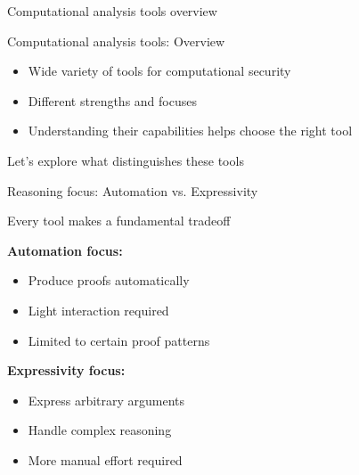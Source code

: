 \documentclass[aspectratio=169, lualatex, handout]{beamer}
\begin{document}
\begin{frame}{Computational analysis tools overview}
\end{frame}

\begin{frame}{Computational analysis tools: Overview}
	\begin{itemize}
		\item Wide variety of tools for computational security
		\item Different strengths and focuses
		\item Understanding their capabilities helps choose the right tool
	\end{itemize}
	\vspace{1em}
	\begin{center}
		\Large
		Let's explore what distinguishes these tools
	\end{center}
\end{frame}

\begin{frame}{Reasoning focus: Automation vs. Expressivity}
	\begin{center}
		\Large
		Every tool makes a fundamental tradeoff
	\end{center}
	\vspace{1em}
	\textbf{Automation focus:}
	\begin{itemize}
		\item Produce proofs automatically
		\item Light interaction required
		\item Limited to certain proof patterns
	\end{itemize}
	\vspace{0.5em}
	\textbf{Expressivity focus:}
	\begin{itemize}
		\item Express arbitrary arguments
		\item Handle complex reasoning
		\item More manual effort required
	\end{itemize}
\end{frame}
\end{document}
